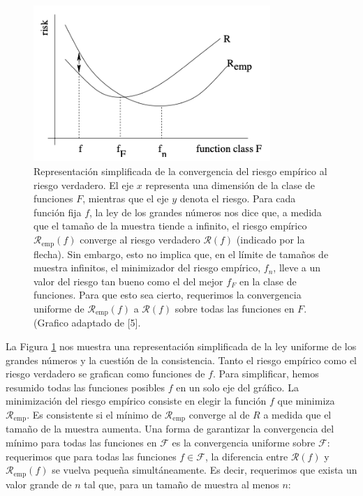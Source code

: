 \documentclass{report}
\begin{document}
\begin{figure}[ht!]
    \centering
    \includegraphics[width=0.8\textwidth]{Images/4.png}
    
    \caption{Representación simplificada de la convergencia del riesgo empírico al riesgo verdadero. El eje \(x\) 
    representa una dimensión de la clase de funciones \(F\), mientras que el eje \(y\) denota el riesgo. Para cada 
    función fija \(f\), la ley de los grandes números nos dice que, a medida que el tamaño de la muestra tiende a 
    infinito, el riesgo empírico \(\mathcal{R}_{\text{emp}}(f)\) converge al riesgo verdadero \(\mathcal{R}(f)\) (indicado por la flecha). 
    Sin embargo, esto no implica que, en el límite de tamaños de muestra infinitos, el minimizador del riesgo 
    empírico, \(f_n\), lleve a un valor del riesgo tan bueno como el del mejor \(f_F\) en la clase de funciones. 
    Para que esto sea cierto, requerimos la convergencia uniforme de \(\mathcal{R}_{\text{emp}}(f)\) a \(\mathcal{R}(f)\) sobre todas 
    las funciones en \(F\). (Grafico adaptado de [5].}
    \label{riesgo vs riesgo empirico}
    \end{figure}
    
La Figura \ref{riesgo vs riesgo empirico} nos muestra una representación simplificada de la ley uniforme de los grandes números y la cuestión 
de la consistencia. Tanto el riesgo empírico como el riesgo verdadero se grafican como funciones de \(f\). 
Para simplificar, hemos resumido todas las funciones posibles \(f\) en un solo eje del gráfico. La minimización 
del riesgo empírico consiste en elegir la función \(f\) que minimiza \(\mathcal{R}_{\text{emp}}\). Es consistente si el 
mínimo de \(\mathcal{R}_{\text{emp}}\) converge al de \(R\) a medida que el tamaño de la muestra aumenta. Una forma de 
garantizar la convergencia del mínimo para todas las funciones en \(\mathcal{F}\) es la convergencia uniforme sobre 
\(\mathcal{F}\): requerimos que para todas las funciones \(f \in \mathcal{F}\), la diferencia entre \(\mathcal{R}(f)\) y \(\mathcal{R}_{\text{emp}}(f)\) 
se vuelva pequeña simultáneamente. Es decir, requerimos que exista un valor grande de \(n\) tal que, para un 
tamaño de muestra al menos \(n\):
\end{document}
